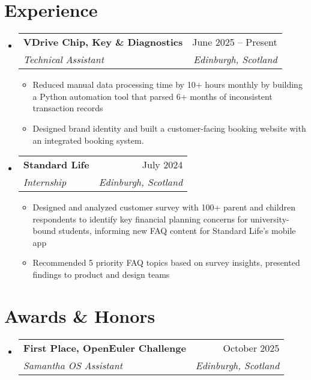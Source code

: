 \documentclass[letterpaper,11pt]{article}
\makeatletter
\newcommand{\resumeItem}[1]{
  \item\small{
    {#1 \vspace{-2pt}}
  }
}
\newcommand{\resumeSubheading}[4]{
  \vspace{-2pt}\item
    \begin{tabular*}{0.97\textwidth}[t]{l@{\extracolsep{\fill}}r}
      \textbf{#1} & #2 \\
      \textit{\small#3} & \textit{\small #4} \\
    \end{tabular*}\vspace{-7pt}
}
\newcommand{\resumeSubSubheading}[2]{
    \item
    \begin{tabular*}{0.97\textwidth}{l@{\extracolsep{\fill}}r}
      \textit{\small#1} & \textit{\small #2} \\
    \end{tabular*}\vspace{-7pt}
}
\newcommand{\resumeSubHeadingListStart}{\begin{itemize}[leftmargin=0.15in, label={}]}
\newcommand{\resumeSubHeadingListEnd}{\end{itemize}}
\newcommand{\resumeItemListStart}{\begin{itemize}}
\newcommand{\resumeItemListEnd}{\end{itemize}\vspace{-5pt}}
\makeatother
\begin{document}
\section{Experience}
\resumeSubHeadingListStart

\resumeSubheading
{VDrive Chip, Key \& Diagnostics}{June 2025 -- Present}
{Technical Assistant}{Edinburgh, Scotland}
\resumeItemListStart
\resumeItem{Reduced manual data processing time by 10+ hours monthly by building a Python automation tool that parsed 6+ months of inconsistent transaction records}
\resumeItem{Designed brand identity and built a customer-facing booking website with an integrated booking system.}
\resumeItemListEnd

\resumeSubheading
{Standard Life}{July 2024}
{Internship}{Edinburgh, Scotland}
\resumeItemListStart
\resumeItem{Designed and analyzed customer survey with 100+ parent and children respondents to identify
  key financial planning concerns for university-bound students, informing new FAQ
  content for Standard Life's mobile app}
\resumeItem{Recommended 5 priority FAQ topics based on survey insights, presented findings to product and design teams}
\resumeItemListEnd

\resumeSubHeadingListEnd



\section{Awards \& Honors}
\resumeSubHeadingListStart
\resumeSubheading
{First Place, OpenEuler Challenge}{October 2025}
{Samantha OS Assistant}{Edinburgh, Scotland}
\resumeSubHeadingListEnd

\end{document}
